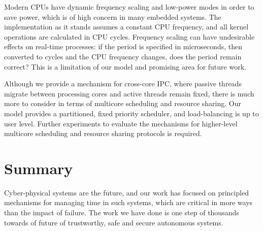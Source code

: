 Modern \glspl{CPU} have dynamic frequency scaling and low-power modes in order to save power, which
is of high concern in many embedded systems. The implementation as it stands assumes a constant
\gls{CPU} frequency, and all kernel operations are calculated in \gls{CPU} cycles. Frequency scaling
can have undesirable effects on real-time processes: if the period is specified in microseconds, then
converted to cycles and the CPU frequency changes, does the period remain correct? This is a
limitation of our model and promising area for future work.

Although we provide a mechanism for cross-core IPC, where passive threads migrate between processing
cores and active threads remain fixed, there is much more to consider in terms of multicore
scheduling and resource sharing. Our model provides a partitioned, fixed priority scheduler, and 
load-balancing is up to user level. Further experiments to evaluate the mechanisms for higher-level
multicore scheduling and resource sharing protocols is required. 
                
\section{Summary}

Cyber-physical systems are the future, and our work has focused on principled mechanisms for
managing time in such systems, which are critical in more ways than the impact of failure. The work
we have done is one step of thousands towards of future of trustworthy, safe and secure
autonomous systems. 

